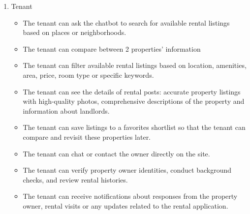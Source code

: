 \begin{enumerate}
    \item Tenant
    \begin{itemize}
        \item The tenant can ask the chatbot to search for available rental listings based on places or neighborhoods. 
        \item The tenant can compare between 2 properties' information
        \item The tenant can filter available rental listings based on location, amenities, area, price, room type or specific keywords.
        \item The tenant can see the details of rental posts: accurate property listings with high-quality photos, comprehensive descriptions of the property and information about landlords.
        \item The tenant can save listings to a favorites shortlist so that the tenant can compare and revisit these properties later.
        \item The tenant can chat or contact the owner directly on the site.
        \item The tenant can verify property owner identities, conduct background checks, and review rental histories.
        \item The tenant can receive notifications about responses from the property owner, rental visits or any updates related to the rental application.
    \end{itemize}
    

\end{enumerate}

